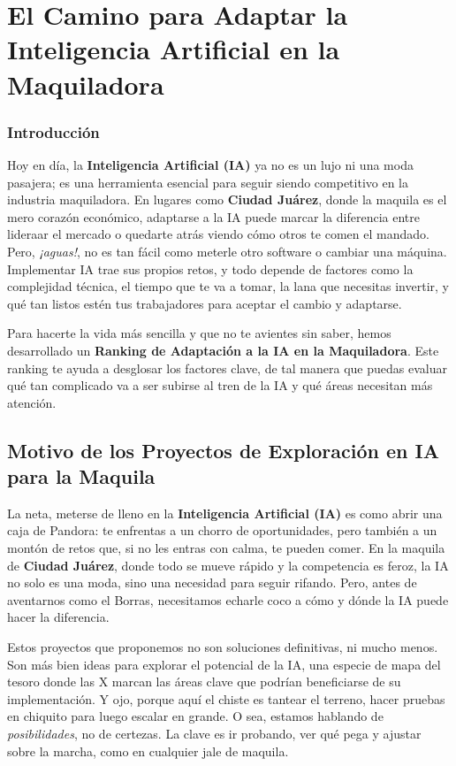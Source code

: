 \chapter{El Camino para Adaptar la Inteligencia Artificial en la Maquiladora}
\label{camino-adaptacion-ia-maquiladora}

\subsection{Introducción}

Hoy en día, la \textbf{Inteligencia Artificial (IA)} ya no es un lujo ni una moda pasajera; es una herramienta esencial para seguir siendo competitivo en la industria maquiladora. En lugares como \textbf{Ciudad Juárez}, donde la maquila es el mero corazón económico, adaptarse a la IA puede marcar la diferencia entre lideraar el mercado o quedarte atrás viendo cómo otros te comen el mandado. Pero, \textit{¡aguas!}, no es tan fácil como meterle otro software o cambiar una máquina. Implementar IA trae sus propios retos, y todo depende de factores como la complejidad técnica, el tiempo que te va a tomar, la lana que necesitas invertir, y qué tan listos estén tus trabajadores para aceptar el cambio y adaptarse.

Para hacerte la vida más sencilla y que no te avientes sin saber, hemos desarrollado un \textbf{Ranking de Adaptación a la IA en la Maquiladora}. Este ranking te ayuda a desglosar los factores clave, de tal manera que puedas evaluar qué tan complicado va a ser subirse al tren de la IA y qué áreas necesitan más atención.
\section{Motivo de los Proyectos de Exploración en IA para la Maquila}

La neta, meterse de lleno en la \textbf{Inteligencia Artificial (IA)} es como abrir una caja de Pandora: te enfrentas a un chorro de oportunidades, pero también a un montón de retos que, si no les entras con calma, te pueden comer. En la maquila de \textbf{Ciudad Juárez}, donde todo se mueve rápido y la competencia es feroz, la IA no solo es una moda, sino una necesidad para seguir rifando. Pero, antes de aventarnos como el Borras, necesitamos echarle coco a cómo y dónde la IA puede hacer la diferencia.

Estos proyectos que proponemos no son soluciones definitivas, ni mucho menos. Son más bien ideas para explorar el potencial de la IA, una especie de mapa del tesoro donde las X marcan las áreas clave que podrían beneficiarse de su implementación. Y ojo, porque aquí el chiste es tantear el terreno, hacer pruebas en chiquito para luego escalar en grande. O sea, estamos hablando de \textit{posibilidades}, no de certezas. La clave es ir probando, ver qué pega y ajustar sobre la marcha, como en cualquier jale de maquila.

